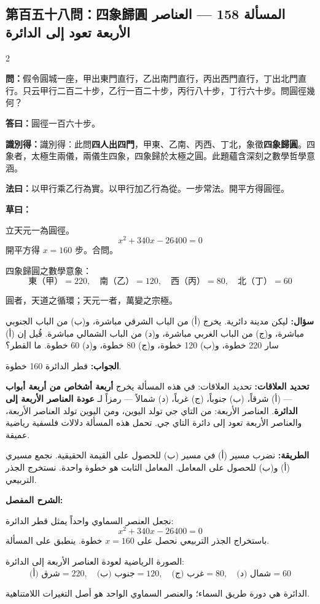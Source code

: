 \documentclass[11pt,a4paper]{article}
\newcommand{\ar}[1]{\arabicfont\beginR #1\endR}
\newcommand{\arb}[1]{\textbf{\arabicfont\beginR #1\endR}}
\newcommand{\arnote}[1]{\textcolor{arabicblue}{\ar{#1}}}
\newcommand{\wen}[1]{\par\noindent\textbf{\textcolor{probcolor}{問：}}{#1}\par}
\newcommand{\da}[1]{\par\noindent\textbf{\textcolor{anscolor}{答曰：}}{#1}\par}
\newcommand{\fayue}[1]{\par\noindent\textbf{\textcolor{methodcolor}{法曰：}}{#1}\par}
\newcommand{\caoyue}[1]{\par\noindent\textbf{草曰：}{#1}\par}
\newcommand{\zhi}[1]{\par\noindent\textbf{識別得：}{#1}\par}
\newcommand{\arwen}[1]{\par\noindent\arb{سؤال: }\arnote{#1}\par}
\newcommand{\arjwb}[1]{\par\noindent\arb{الجواب: }\arnote{#1}\par}
\newcommand{\arqwd}[1]{\par\noindent\arb{الطريقة: }\arnote{#1}\par}
\newcommand{\arshr}[1]{\par\noindent\arb{الشرح المفصل: }\arnote{#1}\par}
\newcommand{\arfl}[1]{\par\noindent\arb{تحديد العلاقات: }\arnote{#1}\par}
\begin{document}
\subsection*{第百五十八問：四象歸圓 \hfill \ar{المسألة 158 — العناصر الأربعة تعود إلى الدائرة}}

\begin{paracol}{2}

\begin{leftcolumn}
\wen{假令圓城一座，甲出東門直行，乙出南門直行，丙出西門直行，丁出北門直行。只云甲行二百二十步，乙行一百二十步，丙行八十步，丁行六十步。問圓徑幾何？}

\da{圓徑一百六十步。}

\zhi{識別得：此問\textbf{四人出四門}，甲東、乙南、丙西、丁北，象徵\textbf{四象歸圓}。四象者，太極生兩儀，兩儀生四象，四象歸於太極之圓。此題蘊含深刻之數學哲學意涵。}

\fayue{以甲行乘乙行為實。以甲行加乙行為從。一步常法。開平方得圓徑。}

\caoyue{
立天元一為圓徑。
$$x^2 + 340x - 26400 = 0$$
開平方得 $x = 160$ 步。合問。

四象歸圓之數學意象：
$$\text{東（甲）} = 220, \quad \text{南（乙）} = 120, \quad \text{西（丙）} = 80, \quad \text{北（丁）} = 60$$

圓者，天道之循環；天元一者，萬變之宗極。}
\end{leftcolumn}

\begin{rightcolumn}
\arwen{ليكن مدينة دائرية. يخرج (أ) من الباب الشرقي مباشرة، و(ب) من الباب الجنوبي مباشرة، و(ج) من الباب الغربي مباشرة، و(د) من الباب الشمالي مباشرة. قُيل إن (أ) سار 220 خطوة، و(ب) 120 خطوة، و(ج) 80 خطوة، و(د) 60 خطوة. ما القطر؟}

\arjwb{قطر الدائرة 160 خطوة.}

\arfl{تحديد العلاقات: في هذه المسألة يخرج \textbf{أربعة أشخاص من أربعة أبواب} — (أ) شرقاً، (ب) جنوباً، (ج) غرباً، (د) شمالاً — رمزاً لـ \textbf{عودة العناصر الأربعة إلى الدائرة}. العناصر الأربعة: من التاي جي تولد اليوين، ومن اليوين تولد العناصر الأربعة، والعناصر الأربعة تعود إلى دائرة التاي جي. تحمل هذه المسألة دلالات فلسفية رياضية عميقة.}

\arqwd{نضرب مسير (أ) في مسير (ب) للحصول على القيمة الحقيقية. نجمع مسيري (أ) و(ب) للحصول على المعامل. المعامل الثابت هو خطوة واحدة. نستخرج الجذر التربيعي.}

\arshr{نجعل العنصر السماوي واحداً يمثل قطر الدائرة:
$$x^2 + 340x - 26400 = 0$$
باستخراج الجذر التربيعي نحصل على $x = 160$ خطوة. ينطبق على المسألة.

الصورة الرياضية لعودة العناصر الأربعة إلى الدائرة:
$$\text{شرق (أ)} = 220, \quad \text{جنوب (ب)} = 120, \quad \text{غرب (ج)} = 80, \quad \text{شمال (د)} = 60$$

الدائرة هي دورة طريق السماء؛ والعنصر السماوي الواحد هو أصل التغيرات اللامتناهية.}
\end{rightcolumn}

\end{paracol}
\end{document}
